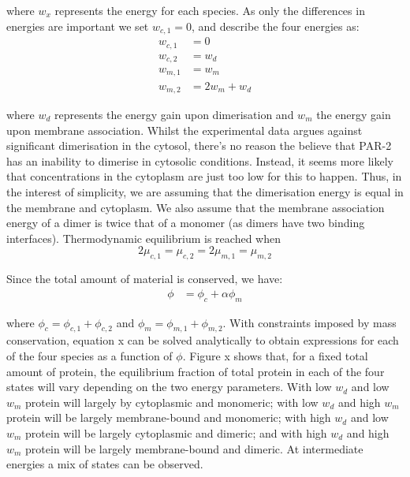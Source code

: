 \documentclass[12pt]{"article"}
\begin{document}
where $w_x$ represents the energy for each species. As only the differences in energies are important we set $w_{c,1} = 0$, and describe the four energies as:
\begin{align}
w_{c,1} &= 0\\
w_{c,2} &= w_d\\
w_{m,1} &= w_m\\
w_{m,2} &= 2w_m + w_d
\end{align}

where $w_d$ represents the energy gain upon dimerisation and $w_m$ the energy gain upon membrane association. Whilst the experimental data argues against significant dimerisation in the cytosol, there's no reason the believe that PAR-2 has an inability to dimerise in cytosolic conditions. Instead, it seems more likely that concentrations in the cytoplasm are just too low for this to happen. Thus, in the interest of simplicity, we are assuming that the dimerisation energy is equal in the membrane and cytoplasm. We also assume that the membrane association energy of a dimer is twice that of a monomer (as dimers have two binding interfaces). Thermodynamic equilibrium is reached when
\begin{equation}
2\mu_{c,1} = \mu_{c,2} = 2\mu_{m,1} = \mu_{m,2}
\end{equation}

Since the total amount of material is conserved, we have:
\begin{align}
\phi &= \phi_c + \alpha\phi_m
\end{align}

where $\phi_c = \phi_{c,1} + \phi_{c,2}$ and $\phi_m = \phi_{m,1} + \phi_{m,2}$. With constraints imposed by mass conservation, equation x can be solved analytically to obtain expressions for each of the four species as a function of $\phi$. Figure x shows that, for a fixed total amount of protein, the equilibrium fraction of total protein in each of the four states will vary depending on the two energy parameters. With low $w_d$ and low $w_m$ protein will largely by cytoplasmic and monomeric; with low $w_d$ and high $w_m$ protein will be largely membrane-bound and monomeric; with high $w_d$ and low $w_m$ protein will be largely cytoplasmic and dimeric; and with high $w_d$ and high $w_m$ protein will be largely membrane-bound and dimeric. At intermediate energies a mix of states can be observed.\\
\end{document}
